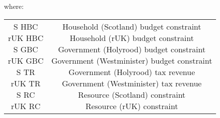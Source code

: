 where:
\begin{table}[H]
    \centering
    \begin{tabular}{c|c}
        \makecell{
            S HBC \\
            rUK HBC \\
            S GBC \\
            rUK GBC \\
            S TR \\
            rUK TR \\
            S RC \\
            rUK RC \\
        } & 
        \makecell{
            Household (Scotland) budget constraint \\
            Household (rUK) budget constraint \\
            Government (Holyrood) budget constraint \\
            Government (Westminister) budget constraint \\
            Government (Holyrood) tax revenue \\
            Government (Westminister) tax revenue \\
            Resource (Scotland) constraint \\
            Resource (rUK) constraint \\
        }
    \end{tabular}
\end{table}

\restoregeometry

\renewcommand{\arraystretch}{2}

